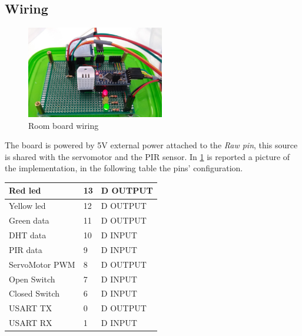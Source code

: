 \subsection{Wiring}
	\begin{figure}[h]
		\centering
		\includegraphics[width=6cm,keepaspectratio]{img/room_board_wiring}
		\caption{Room board wiring}
		\label{fig:room_wiring}
	\end{figure}
	The board is powered by 5V external power attached to the \textit{Raw pin}, this source is shared with the servomotor and the PIR sensor.
	In \ref{fig:room_wiring} is reported a picture of the implementation, in the following table the pins' configuration.
	\begin{center}
		\begin{tabular}{||l | l | l ||} 
			\hline
			Red led 			& 13 & D OUTPUT\\ 
			\hline
			Yellow led 			& 12 & D OUTPUT\\
			\hline
			Green data 			& 11 & D OUTPUT\\ 
			\hline
			DHT data 			& 10 & D INPUT\\ 
			\hline
			PIR data 			& 9 & D INPUT\\ 
			\hline
			ServoMotor PWM 		& 8 & D OUTPUT\\ 
			\hline
			Open Switch 		& 7 & D INPUT\\ 
			\hline
			Closed Switch 		& 6 & D INPUT\\ 
			\hline
			USART TX	 		& 0 & D OUTPUT\\ 
			\hline
			USART RX 			& 1 & D INPUT\\ 
			\hline
		\end{tabular}
	\end{center}
	